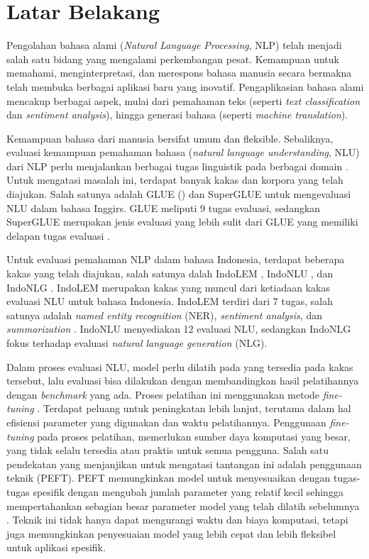\section{Latar Belakang}
\label{sec:latar-belakang}

Pengolahan bahasa alami (\textit{Natural Language Processing}, NLP) telah menjadi salah satu bidang yang mengalami perkembangan pesat. Kemampuan untuk memahami, menginterpretasi, dan merespons bahasa manusia secara bermakna telah membuka berbagai aplikasi baru yang inovatif. Pengaplikasian bahasa alami mencakup berbagai aspek, mulai dari pemahaman teks (seperti \textit{text classification} dan \textit{sentiment analysis}), hingga generasi bahasa (seperti \textit{machine translation}).

Kemampuan bahasa dari manusia bersifat umum dan fleksible. Sebaliknya, evaluasi kemampuan pemahaman bahasa (\textit{natural language understanding}, NLU) dari NLP perlu menjalankan berbagai tugas linguistik pada berbagai domain \parencite{glue}. Untuk mengatasi masalah ini, terdapat banyak kakas dan korpora yang telah diajukan. Salah satunya adalah GLUE () \parencite{glue} dan SuperGLUE \parencite{superglue} untuk mengevaluasi NLU dalam bahasa Inggirs. GLUE meliputi 9 tugas evaluasi, sedangkan SuperGLUE merupakan jenis evaluasi yang lebih sulit dari GLUE yang memiliki delapan tugas evaluasi \parencite{indolem}.

Untuk evaluasi pemahaman NLP dalam bahasa Indonesia, terdapat beberapa kakas yang telah diajukan, salah satunya dalah IndoLEM \parencite{indolem}, IndoNLU \parencite{indonlu}, dan IndoNLG \parencite{indonlg}. IndoLEM merupakan kakas yang muncul dari ketiadaan kakas evaluasi NLU untuk bahasa Indonesia. IndoLEM terdiri dari 7 tugas, salah satunya adalah \textit{named entity recognition} (NER), \textit{sentiment analysis}, dan \textit{summarization} \parencite{indolem}. IndoNLU menyediakan 12 evaluasi NLU, sedangkan IndoNLG fokus terhadap evaluasi \textit{natural language generation} (NLG).

Dalam proses evaluasi NLU, model perlu dilatih pada  yang tersedia pada kakas tersebut, lalu evaluasi bisa dilakukan dengan membandingkan hasil pelatihannya dengan \textit{benchmark} yang ada. Proses pelatihan ini menggunakan metode \textit{fine-tuning} \parencite{indolem}. Terdapat peluang untuk peningkatan lebih lanjut, terutama dalam hal efisiensi parameter yang digunakan dan waktu pelatihannya. Penggunaan \textit{fine-tuning} pada proses pelatihan, memerlukan sumber daya komputasi yang besar, yang tidak selalu tersedia atau praktis untuk semua pengguna. Salah satu pendekatan yang menjanjikan untuk mengatasi tantangan ini adalah penggunaan teknik \PEFT (PEFT). PEFT memungkinkan model untuk menyesuaikan dengan tugas-tugas spesifik dengan mengubah jumlah parameter yang relatif kecil sehingga mempertahankan sebagian besar parameter model yang telah dilatih sebelumnya \parencite{adapter}. Teknik ini tidak hanya dapat mengurangi waktu dan biaya komputasi, tetapi juga memungkinkan penyesuaian model yang lebih cepat dan lebih fleksibel untuk aplikasi spesifik. 


